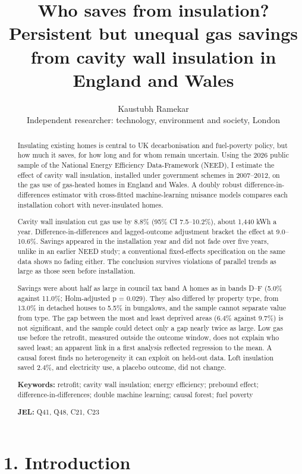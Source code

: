 \documentclass[11pt,a4paper]{article}
\title{Who saves from insulation? Persistent but unequal gas savings from cavity wall insulation in England and Wales}
\author{Kaustubh Ramekar\\[2pt]\small Independent researcher: technology, environment and society, London}
\date{}
\begin{document}
\maketitle

\begin{abstract}
\noindent Insulating existing homes is central to UK decarbonisation and fuel-poverty policy, but how much it saves, for how long and for whom remain uncertain. Using the 2026 public sample of the National Energy Efficiency Data-Framework (NEED), I estimate the effect of cavity wall insulation, installed under government schemes in 2007–2012, on the gas use of gas-heated homes in England and Wales. A doubly robust difference-in-differences estimator with cross-fitted machine-learning nuisance models compares each installation cohort with never-insulated homes.

Cavity wall insulation cut gas use by 8.8\% (95\% CI 7.5–10.2\%), about 1,440 kWh a year. Difference-in-differences and lagged-outcome adjustment bracket the effect at 9.0–10.6\%. Savings appeared in the installation year and did not fade over five years, unlike in an earlier NEED study; a conventional fixed-effects specification on the same data shows no fading either. The conclusion survives violations of parallel trends as large as those seen before installation.

Savings were about half as large in council tax band A homes as in bands D–F (5.0\% against 11.0\%; Holm-adjusted p = 0.029). They also differed by property type, from 13.0\% in detached houses to 5.5\% in bungalows, and the sample cannot separate value from type. The gap between the most and least deprived areas (6.4\% against 9.7\%) is not significant, and the sample could detect only a gap nearly twice as large. Low gas use before the retrofit, measured outside the outcome window, does not explain who saved least; an apparent link in a first analysis reflected regression to the mean. A causal forest finds no heterogeneity it can exploit on held-out data. Loft insulation saved 2.4\%, and electricity use, a placebo outcome, did not change.

\medskip
\noindent\textbf{Keywords:} retrofit; cavity wall insulation; energy efficiency; prebound effect; difference-in-differences; double machine learning; causal forest; fuel poverty

\smallskip
\noindent\textbf{JEL:} Q41, Q48, C21, C23
\end{abstract}

\section*{1. Introduction}
\end{document}
